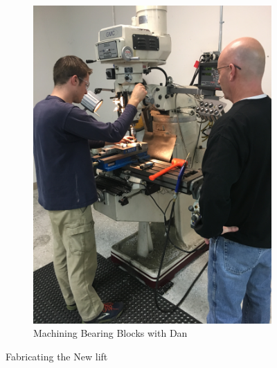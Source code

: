 \documentclass{article}
\begin{document}
\begin{figure}[h!]
\begin{subfigure}{.45\textwidth}
  \includegraphics[width=\textwidth,angle=-90]{25_02-18/images/Make.jpg}
    \caption{Machining Bearing Blocks with Dan}
    \label{fig:Machining}
  \end{subfigure}
  \caption{Fabricating the New lift}
   \end{figure}
   
\end{document}
